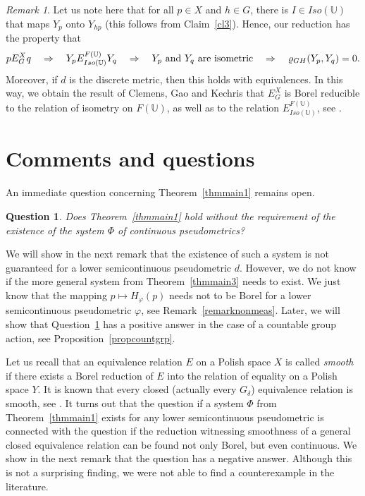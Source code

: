 \documentclass[a4paper]{amsart}
\theoremstyle{plain}
\newtheorem{question}[theorem]{Question}
\theoremstyle{remark}
\newtheorem{remark}[theorem]{Remark}
\begin{document}
\begin{remark}
Let us note here that for all $ p \in X $ and $ h \in G $, there is $ I \in Iso(\mathbb{U}) $ that maps $ Y_{p} $ onto $ Y_{hp} $ (this follows from Claim~\ref{cl3}). Hence, our reduction has the property that
$$ p E^{X}_{G} q \quad \Rightarrow \quad Y_{p} E^{F(\mathbb{U})}_{Iso(\mathbb{U})} Y_{q} \quad \Rightarrow \quad \textnormal{$ Y_{p} $ and $ Y_{q} $ are isometric} \quad \Rightarrow \quad \varrho_{GH}(Y_{p}, Y_{q}) = 0. $$
Moreover, if $ d $ is the discrete metric, then this holds with equivalences. In this way, we obtain the result of Clemens, Gao and Kechris that $ E^{X}_{G} $ is Borel reducible to the relation of isometry on $ F(\mathbb{U}) $, as well as to the relation $ E^{F(\mathbb{U})}_{Iso(\mathbb{U})} $, see \cite{clemens, gaokech}.
\end{remark}



\section{Comments and questions} \label{section:comments}


An immediate question concerning Theorem~\ref{thmmain1} remains open.


\begin{question} \label{question1}
Does Theorem~\ref{thmmain1} hold without the requirement of the existence of the system $ \Phi $ of continuous pseudometrics?
\end{question}


We will show in the next remark that the existence of such a system is not guaranteed for a lower semicontinuous pseudometric $ d $. However, we do not know if the more general system from Theorem~\ref{thmmain3} needs to exist. We just know that the mapping $ p \mapsto H_{\varphi}(p) $ needs not to be Borel for a lower semicontinuous pseudometric $ \varphi $, see Remark~\ref{remarknonmeas}. Later, we will show that Question~\ref{question1} has a positive answer in the case of a countable group action, see Proposition~\ref{propcountgrp}.

Let us recall that an equivalence relation $ E $ on a Polish space $ X $ is called \emph{smooth} if there exists a Borel reduction of $ E $ into the relation of equality on a Polish space $ Y $. It is known that every closed (actually every $ G_{\delta} $) equivalence relation is smooth, see \cite[Corollary~1.2]{haloke}. It turns out that the question if a system $ \Phi $ from Theorem~\ref{thmmain1} exists for any lower semicontinuous pseudometric is connected with the question if the reduction witnessing smoothness of a general closed equivalence relation can be found not only Borel, but even continuous. We show in the next remark that the question has a negative answer. Although this is not a surprising finding, we were not able to find a counterexample in the literature.
\end{document}
